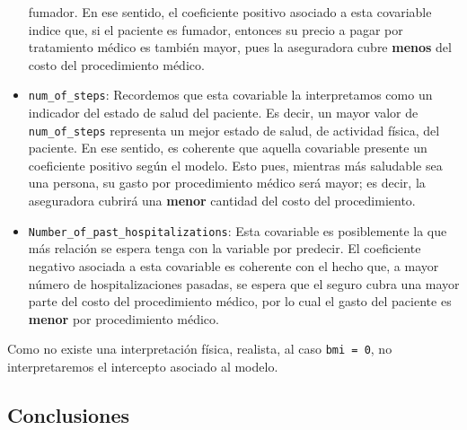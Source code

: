 \documentclass[
]{article}
\begin{document}
\begin{itemize}
  fumador. En ese sentido, el coeficiente positivo asociado a esta
  covariable indice que, si el paciente es fumador, entonces su precio a
  pagar por tratamiento médico es también mayor, pues la aseguradora
  cubre \textbf{menos} del costo del procedimiento médico.
\item
  \texttt{num\_of\_steps}: Recordemos que esta covariable la
  interpretamos como un indicador del estado de salud del paciente. Es
  decir, un mayor valor de \texttt{num\_of\_steps} representa un mejor
  estado de salud, de actividad física, del paciente. En ese sentido, es
  coherente que aquella covariable presente un coeficiente positivo
  según el modelo. Esto pues, mientras más saludable sea una persona, su
  gasto por procedimiento médico será mayor; es decir, la aseguradora
  cubrirá una \textbf{menor} cantidad del costo del procedimiento.
\item
  \texttt{Number\_of\_past\_hospitalizations}: Esta covariable es
  posiblemente la que más relación se espera tenga con la variable por
  predecir. El coeficiente negativo asociada a esta covariable es
  coherente con el hecho que, a mayor número de hospitalizaciones
  pasadas, se espera que el seguro cubra una mayor parte del costo del
  procedimiento médico, por lo cual el gasto del paciente es
  \textbf{menor} por procedimiento médico.
\end{itemize}

Como no existe una interpretación física, realista, al caso
\texttt{bmi\ =\ 0}, no interpretaremos el intercepto asociado al modelo.

\subsection{Conclusiones}\label{conclusiones}
\end{document}
